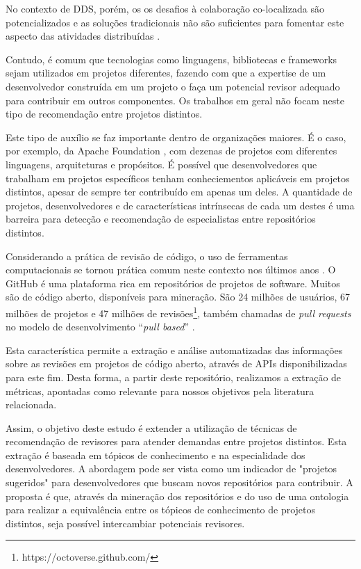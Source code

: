 \documentclass[sigconf]{acmart}
\begin{document}
No contexto de DDS, porém, os os desafios à colaboração co-localizada são potencializados e as soluções tradicionais não são suficientes para fomentar este aspecto das atividades distribuídas \cite{nicolaci2011}.

Contudo, é comum que tecnologias como linguagens, bibliotecas e frameworks sejam utilizados em projetos diferentes, fazendo com que a expertise de um desenvolvedor construída em um projeto o faça um potencial revisor adequado para contribuir em outros componentes. Os trabalhos em geral não focam neste tipo de recomendação entre projetos distintos.

Este tipo de auxílio se faz importante dentro de organizações maiores. É o caso, por exemplo, da Apache Foundation \cite{chelkowski2016}, com dezenas de projetos com diferentes linguagens, arquiteturas e propósitos. É possível que desenvolvedores que trabalham em projetos específicos tenham conheciementos aplicáveis em projetos distintos, apesar de sempre ter contribuído em apenas um deles. A quantidade de projetos, desenvolvedores e de características intrínsecas de cada um destes é uma barreira para detecção e recomendação de especialistas entre repositórios distintos.

Considerando a prática de revisão de código, o uso de ferramentas computacionais se tornou prática comum neste contexto nos últimos anos \cite{Bacchelli2013}. O GitHub é uma plataforma rica em repositórios de projetos de software. Muitos são de código aberto, disponíveis para mineração. São 24 milhões de usuários, 67 milhões de projetos e 47 milhões de revisões\footnote{https://octoverse.github.com/}, também chamadas de \textit{pull requests} no modelo de desenvolvimento ``\textit{pull based}'' \cite{gousios2014}.

Esta característica permite a extração e análise automatizadas das informações sobre as revisões em projetos de código aberto, através de APIs disponibilizadas para este fim. Desta forma, a partir deste repositório, realizamos a extração de métricas, apontadas como relevante para nossos objetivos pela literatura relacionada.

Assim, o objetivo deste estudo é extender a utilização de técnicas de recomendação de revisores para atender demandas entre projetos distintos. Esta extração é baseada em tópicos de conhecimento e na especialidade dos desenvolvedores. A abordagem pode ser vista como um indicador de "projetos sugeridos" para desenvolvedores que buscam novos repositórios para contribuir. A proposta é que, através da mineração dos repositórios e do uso de uma ontologia para realizar a equivalência entre os tópicos de conhecimento de projetos distintos, seja possível intercambiar potenciais revisores.
\end{document}
